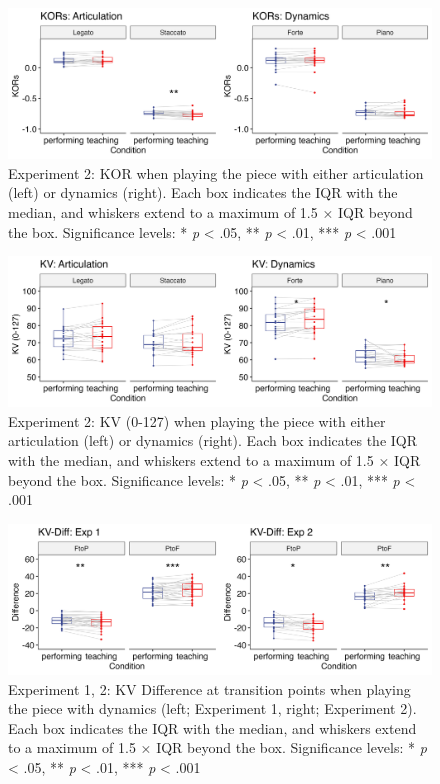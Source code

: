 \documentclass[
  english,
  man,floatsintext]{apa6}
\begin{document}
\begin{figure}
\includegraphics[width=1\linewidth]{manuscript_files/figure-latex/plot-kor-2-1} \caption{\label{fig:kor-2}Experiment 2: KOR when playing the piece with either articulation (left) or dynamics (right). Each box indicates the IQR with the median, and whiskers extend to a maximum of 1.5 × IQR beyond the box. Significance levels: * \textit{p} < .05, ** \textit{p} < .01, *** \textit{p} < .001}\label{fig:plot-kor-2}
\end{figure}

\begin{figure}
\includegraphics[width=1\linewidth]{manuscript_files/figure-latex/plot-vel-2-1} \caption{\label{fig:vel-2}Experiment 2: KV (0-127) when playing the piece with either articulation (left) or dynamics (right). Each box indicates the IQR with the median, and whiskers extend to a maximum of 1.5 × IQR beyond the box. Significance levels: * \textit{p} < .05, ** \textit{p} < .01, *** \textit{p} < .001}\label{fig:plot-vel-2}
\end{figure}

\begin{figure}
\includegraphics[width=1\linewidth]{manuscript_files/figure-latex/plot-vel-diff-1} \caption{\label{fig:vel-diff}Experiment 1, 2: KV Difference at transition points when playing the piece with dynamics (left; Experiment 1, right; Experiment 2). Each box indicates the IQR with the median, and whiskers extend to a maximum of 1.5 × IQR beyond the box. Significance levels: * \textit{p} < .05, ** \textit{p} < .01, *** \textit{p} < .001}\label{fig:plot-vel-diff}
\end{figure}
\end{document}
